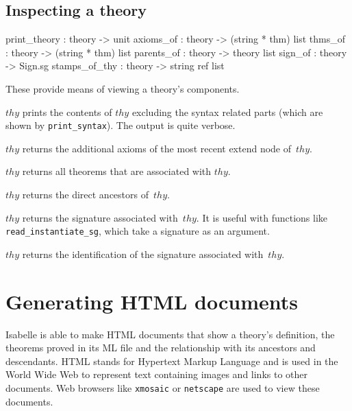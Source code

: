 \subsection{Inspecting a theory}\label{sec:inspct-thy}
\begin{ttbox}
print_theory  : theory -> unit
axioms_of     : theory -> (string * thm) list
thms_of       : theory -> (string * thm) list
parents_of    : theory -> theory list
sign_of       : theory -> Sign.sg
stamps_of_thy : theory -> string ref list
\end{ttbox}
These provide means of viewing a theory's components.
\begin{ttdescription}
\item[\ttindexbold{print_theory} $thy$]
prints the contents of $thy$ excluding the syntax related parts (which are
shown by {\tt print_syntax}).  The output is quite verbose.

\item[\ttindexbold{axioms_of} $thy$]
returns the additional axioms of the most recent extend node of~$thy$.

\item[\ttindexbold{thms_of} $thy$]
returns all theorems that are associated with $thy$.

\item[\ttindexbold{parents_of} $thy$]
returns the direct ancestors of~$thy$.

\item[\ttindexbold{sign_of} $thy$]
returns the signature associated with~$thy$.  It is useful with functions
like {\tt read_instantiate_sg}, which take a signature as an argument.

\item[\ttindexbold{stamps_of_thy} $thy$]
returns the identification  of the signature associated
with~$thy$.
\end{ttdescription}


\section{Generating HTML documents}

Isabelle is able to make HTML documents that show a theory's
definition, the theorems proved in its ML file and the relationship
with its ancestors and descendants. HTML stands for Hypertext Markup
Language and is used in the World Wide Web to represent text
containing images and links to other documents. Web browsers like
{\tt xmosaic} or {\tt netscape} are used to view these documents.

